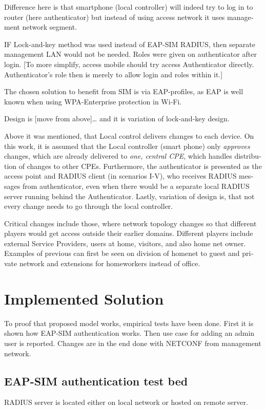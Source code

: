 \documentclass[12pt,a4paper,english]{tutthesis}
\begin{document}
\begin{otherlanguage}{english}
Difference here is that smartphone (local controller) will indeed try
to log in to router (here authenticator) but instead of using access network it uses 
management  network segment.


IF Lock-and-key method was used instead of EAP-SIM RADIUS, then
separate management LAN would not be needed. Roles were given on
authenticator after login.  [To more simplify, access mobile should
try access Authenticator directly. Authenticator's role then is merely
to allow login and roles within it.]



The chosen solution to benefit from SIM is via EAP-profiles, as EAP
is well known when using WPA-Enterprise protection in Wi-Fi.

Design is [move from above]\ldots{}
and it is variation of lock-and-key design.

Above it was mentioned, that Local control delivers changes to each
device. On this work, it is assumed that the Local controller (smart
phone) only \emph{approves} changes, which are already delivered to \emph{one,
central CPE}, which handles distribution of changes to other CPEs.
Furthermore, the authenticator is presented as the access point and
RADIUS client (in scenarios I-V), who receives RADIUS messages from
authenticator, even when there would be a separate local RADIUS server
running behind the Authenticator. 
Lastly, variation of design is, that not every change needs to go
 through  the local controller.




Critical changes include those, where network topology changes so
that different players would get access outside their earlier domains.
Different players include external Service Providers, users at home,
visitors, and also home net owner. Examples of previous can first be
seen on division of homenet to guest and private network and
extensions for homeworkers instead of office.


\chapter{Implemented Solution}
\label{sec-5}


To proof that proposed model works, empirical tests have been done.
First it is shown how EAP-SIM authentication works. Then use case for
adding an admin user is reported. Changes are in the end done with
NETCONF from management network.

\section{EAP-SIM authentication test bed}
\label{sec-5-1}
RADIUS server is located either on local network or hosted on remote
server.


\end{otherlanguage}
\end{document}
